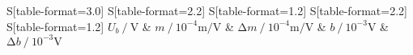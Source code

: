 \begin{table}
    \centering
    \caption{Fitparameter: Steigung $m$ und y-Achsenabschnitt $b$.}
    \label{tab:c}
    \begin{tabular}{
	S[table-format=3.0]
	S[table-format=2.2]
	S[table-format=1.2]
	S[table-format=2.2]
	S[table-format=1.2]
	}
	\toprule
	{$U_b \:/\: \si{\volt}$}		& {$m \:/\: 10^{-4}\si{\metre\per\volt}$}		& 
	{$\increment{m} \:/\: 10^{-4}\si{\metre\per\volt}$}		& {$b \:/\: 10^{-3}\si{\volt}$}		& 
	{$\increment{b} \:/\: 10^{-3}\si{\volt}$}		\\ 
	\midrule
    
    \bottomrule
    \end{tabular}
    \end{table}
